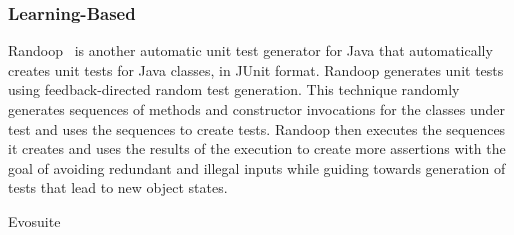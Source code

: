 \cite{xie2009}

\subsubsection{Learning-Based}


Randoop~\cite{pacheco2007feedback} is another automatic unit test generator for Java that automatically creates unit tests for Java classes, in JUnit format.  Randoop generates unit tests using feedback-directed random test generation. This technique randomly generates sequences of methods and constructor invocations for the classes under test and uses
the sequences to create tests. Randoop then executes the sequences it creates and uses the results of the execution to create more assertions with the goal of avoiding redundant and illegal inputs while guiding towards generation of tests that lead to new object states. 

Evosuite
